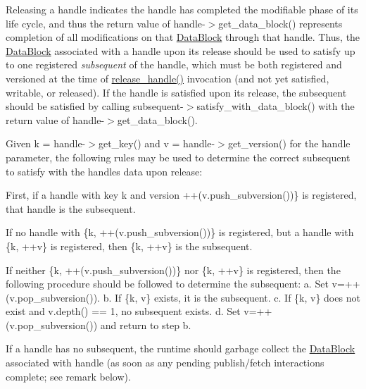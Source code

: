 Releasing a handle indicates the handle has completed the modifiable phase of its life cycle, and thus the return value of handle-\/$>$get\+\_\+data\+\_\+block() represents completion of all modifications on that \hyperlink{classdarma__runtime_1_1abstract_1_1backend_1_1_data_block}{Data\+Block} through that handle. Thus, the \hyperlink{classdarma__runtime_1_1abstract_1_1backend_1_1_data_block}{Data\+Block} associated with a handle upon its release should be used to satisfy up to one registered {\itshape subsequent} of the handle, which must be both registered and versioned at the time of \hyperlink{classdarma__runtime_1_1abstract_1_1backend_1_1_runtime_a54ba21615ed22638ea23a2a1f03fea02}{release\+\_\+handle()} invocation (and not yet satisfied, writable, or released). If the handle is satisfied upon its release, the subsequent should be satisfied by calling subsequent-\/$>$satisfy\+\_\+with\+\_\+data\+\_\+block() with the return value of handle-\/$>$get\+\_\+data\+\_\+block().

Given k = handle-\/$>$get\+\_\+key() and v = handle-\/$>$get\+\_\+version() for the handle parameter, the following rules may be used to determine the correct subsequent to satisfy with the handle\textquotesingle{}s data upon release\+:
\begin{DoxyEnumerate}
\item First, if a handle with key k and version ++(v.\+push\+\_\+subversion())\} is registered, that handle is the subsequent.
\item If no handle with \{k, ++(v.\+push\+\_\+subversion())\} is registered, but a handle with \{k, ++v\} is registered, then \{k, ++v\} is the subsequent.
\item If neither \{k, ++(v.\+push\+\_\+subversion())\} nor \{k, ++v\} is registered, then the following procedure should be followed to determine the subsequent\+: a. Set v\textquotesingle{}=++(v.\+pop\+\_\+subversion()). b. If \{k, v\textquotesingle{}\} exists, it is the subsequent. c. If \{k, v\textquotesingle{}\} does not exist and v\textquotesingle{}.depth() == 1, no subsequent exists. d. Set v\textquotesingle{}=++(v\textquotesingle{}.pop\+\_\+subversion()) and return to step b.
\end{DoxyEnumerate}

If a handle has no subsequent, the runtime should garbage collect the \hyperlink{classdarma__runtime_1_1abstract_1_1backend_1_1_data_block}{Data\+Block} associated with handle (as soon as any pending publish/fetch interactions complete; see remark below).

